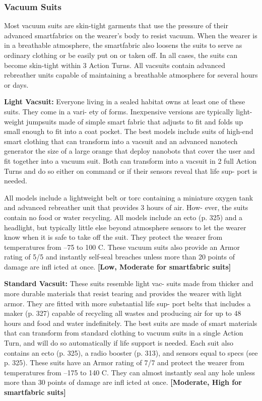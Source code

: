 \subsubsection{Vacuum Suits}

Most vacuum suits are skin-tight garments that use 
the pressure of their advanced smartfabrics on the 
wearer's body to resist vacuum. When the wearer is in 
a breathable atmosphere, the smartfabric also loosens 
the suits to serve as ordinary clothing or be easily 
put on or taken off. In all cases, the suits can become 
skin-tight within 3 Action Turns. All vacsuits contain 
advanced rebreather units capable of maintaining a 
breathable atmosphere for several hours or days.

\textbf{Light Vacsuit:} Everyone living in a sealed habitat 
owns at least one of these suits. They come in a vari-
ety of forms. Inexpensive versions are typically light-
weight jumpsuits made of simple smart fabric that 
adjusts to fit and folds up small enough to fit into a 
coat pocket. The best models include suits of high-end 
smart clothing that can transform into a vacsuit and 
an advanced nanotech generator the size of a large 
orange that deploy nanobots that cover the user and 
fit together into a vacuum suit. Both can transform 
into a vacsuit in 2 full Action Turns and do so either 
on command or if their sensors reveal that life sup-
port is needed.

All models include a lightweight belt or torc 
containing a miniature oxygen tank and advanced 
rebreather unit that provides 3 hours of air. How-
ever, the suits contain no food or water recycling. All 
models include an ecto (p. 325) and a headlight, but 
typically little else beyond atmosphere sensors to let 
the wearer know when it is safe to take off the suit. 
They protect the wearer from temperatures from –75 
to 100 C. These vacuum suits also provide an Armor 
rating of 5/5 and instantly self-seal breaches unless 
more than 20 points of damage are infl icted at once. 
\textbf{[Low, Moderate for smartfabric suits]}

\textbf{Standard Vacsuit:} These suits resemble light vac-
suits made from thicker and more durable materials 
that resist tearing and provides the wearer with light 
armor. They are fitted with more substantial life sup-
port belts that includes a maker (p. 327) capable of 
recycling all wastes and producing air for up to 48 
hours and food and water indefinitely. The best suits 
are made of smart materials that can transform from 
standard clothing to vacuum suits in a single Action 
Turn, and will do so automatically if life support is 
needed. Each suit also contains an ecto (p. 325), a 
radio booster (p. 313), and sensors equal to specs (see 
p. 325). These suits have an Armor rating of 7/7 and 
protect the wearer from temperatures from –175 to 
140 C. They can almost instantly seal any hole unless 
more than 30 points of damage are infl icted at once. 
\textbf{[Moderate, High for smartfabric suits]}

